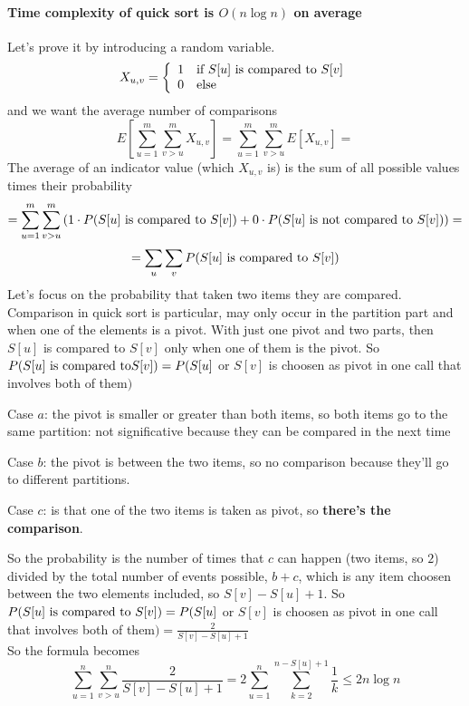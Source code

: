 \documentclass[10pt]{report}
\begin{document}
\paragraph{Time complexity of quick sort is $O(n\log n)$ on average} Let's prove it by introducing a random variable. $$X_{u,v} = \left\{\begin{array}{c l}
1&\hbox{if }S[u]\hbox{ is compared to }S[v]\\0&\hbox{else}
\end{array}\right.$$ and we want the average number of comparisons $$E\left[\sum_{u=1}^m\sum_{v>u}^m X_{u,v}\right] = \sum_{u=1}^m\sum_{v>u}^m E\left[X_{u,v}\right] = $$
The average of an indicator value (which $X_{u,v}$ is) is the sum of all possible values times their probability $$= \sum_{u=1}^m\sum_{v>u}^m \left(1\cdot P(S[u]\hbox{ is compared to }S[v]) + 0\cdot P(S[u]\hbox{ is not compared to }S[v])\right) = $$
$$=\sum_u \sum_v P(S[u]\hbox{ is compared to }S[v])$$
Let's focus on the probability that taken two items they are compared. Comparison in quick sort is particular, may only occur in the partition part and when one of the elements is a pivot. With just one pivot and two parts, then $S[u]$ is compared to $S[v]$ only when one of them is the pivot. So $P(S[u]\hbox{ is compared to}S[v]) = P(S[u]$ or $S[v]$ is choosen as pivot in one call that involves both of them$)$
\begin{list}{}{}
	\item Case $a$: the pivot is smaller or greater than both items, so both items go to the same partition: not significative because they can be compared in the next time 
	\item Case $b$: the pivot is between the two items, so no comparison because they'll go to different partitions.
	\item Case $c$: is that one of the two items is taken as pivot, so \textbf{there's the comparison}.
\end{list}
So the probability is the number of times that $c$ can happen (two items, so $2$) divided by the total number of events possible, $b + c$, which is any item choosen between the two elements included, so $S[v] - S[u] + 1$. So $P(S[u]\hbox{ is compared to }S[v]) = P(S[u]$ or $S[v]$ is choosen as pivot in one call that involves both of them$) = \frac{2}{S[v] - S[u] + 1}$\\
So the formula becomes $$\sum_{u=1}^n \sum_{v>u}^n \frac{2}{S[v] - S[u] + 1} = 2\sum_{u=1}^n \sum_{k=2}^{n-S[u]+1} \frac{1}{k} \leq 2n\log n$$
\end{document}
